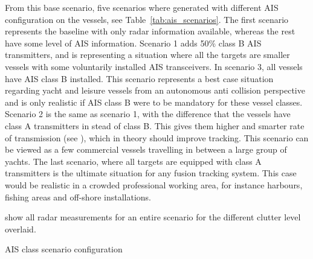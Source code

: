 From this base scenario, five scenarios where generated with different AIS configuration on the vessels, see Table~\ref{tab:ais_scenarios}. The first scenario represents the baseline with only radar information available, whereas the rest have some level of AIS information. Scenario 1 adds 50\% class B AIS transmitters, and is representing a situation where all the targets are smaller vessels with some voluntarily installed AIS transceivers. In scenario 3, all vessels have AIS class B installed. This scenario represents a best case situation regarding yacht and leisure vessels from an autonomous anti collision perspective and is only realistic if AIS class B were to be mandatory for these vessel classes. Scenario 2 is the same as scenario 1, with the difference that the vessels have class A transmitters in stead of class B. This gives them higher and smarter rate of transmission (see ), which in theory should improve tracking. This scenario can be viewed as a few commercial vessels travelling in between a large group of yachts. The last scenario, where all targets are equipped with class A transmitters is the ultimate situation for any fusion tracking system. This case would be realistic in a crowded professional working area, for instance harbours, fishing areas and off-shore installations.

 show all radar measurements for an entire scenario for the different clutter level overlaid. 
\begin{table}
\centering
{}
\caption{AIS class scenario configuration}\label{tab:ais_scenarios}
\end{table}

